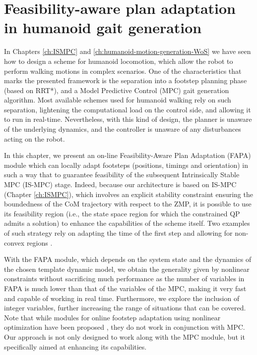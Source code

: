 \chapter{Feasibility-aware plan adaptation in humanoid gait generation}
In Chapters \ref{ch:ISMPC} and \ref{ch:humanoid-motion-generation-WoS} we have
seen how to design a scheme for humanoid locomotion, which allow 
the robot to perform walking motions in complex scenarios. One of the
characteristics that marks the presented framework is the separation into a 
footstep planning phase (based on RRT*), and a Model Predictive Control (MPC)
gait generation algorithm. Most available schemes used for humanoid walking 
rely on such separation, lightening the computational load on the control side,
and allowing it to run in real-time. Nevertheless, with this kind of design,
the planner is unaware of the underlying dynamics, and the controller is unaware
of any disturbances acting on the robot.

In this chapter, we present an on-line
Feasibility-Aware Plan Adaptation (FAPA) module which can locally adapt
footsteps (positions, timings and orientation) in such a way that to guarantee
feasibility of the subsequent Intrinsically Stable MPC (IS-MPC) stage.
Indeed, because our architecture is based on IS-MPC (Chapter \ref{ch:ISMPC}),
which involves an explicit stability constraint ensuring the boundedness of 
the CoM trajectory with respect to the ZMP, it is possible to use its
feasibility region (i.e., the state space region for which the constrained
QP admits a solution) to enhance the capabilities of the scheme itself.
Two examples of such strategy rely on adapting the time of the first step 
\cite{Smaldone2021FeasibilityDrivenSTA} and allowing for non-convex regions 
\cite{Habib2022HandlingNonConvex}. 

With the FAPA module, which depends on the system state and the dynamics
of the chosen template dynamic model, we obtain the generality given by
nonlinear constraints without sacrificing
much performance as the number of variables in FAPA is much lower than
that of the variables of the MPC, making it very fast and capable of working
in real time. Furthermore, we explore the inclusion of integer variables,
further increasing the range of situations that can be covered. Note that while modules for online
footstep adaptation using nonlinear
optimization have been proposed \cite{Ding2019IROS}, they do not work in
conjunction with MPC. Our approach is not only designed to work along
with the MPC module, but it specifically aimed at enhancing its capabilities.

